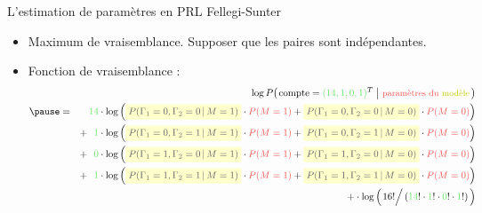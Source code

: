 \begin{frame}{\vskip -0.3cm \large L'estimation de param\`etres en PRL Fellegi-Sunter}
\footnotesize
\begin{itemize}
\pause\item
	Maximum de vraisemblance.\;\;
	Supposer que les paires sont ind\'ependantes.
	\vskip 0.3cm
\pause\item
	Fonction de vraisemblance :
	{\tiny\color{mediumLightGray}
	\begin{eqnarray*}
	&& \log P\!\left(
		\left.
		\textnormal{compte} = {\color{veryDarkGreen}(14 ,1 , 0 ,1)}^{T}
		\;\right\vert\,
		\textnormal{\small\color{customRed}param\`etres du \color{darkYellow}mod\`ele}
		\,\right)
	\\
	\pause
	&=&
		{\color{white}+}\,
		{\color{veryDarkGreen}14} \cdot
			\log\left(
				\colorbox{lightYellow}{\color{darkGray}$P(\Gamma_{1}=0,\Gamma_{2}=0\,\vert\,M=1)$} \cdot {\color{customRed}P(M=1)}
				\overset{{\color{white}.}}{+}
				\colorbox{lightYellow}{\color{darkGray}$P(\Gamma_{1}=0,\Gamma_{2}=0\,\vert\,M=0)$} \cdot {\color{customRed}P(M=0)}
				\right)
	\\
	&&
		+ \, {\color{veryDarkGreen}{\color{white}4}1} \cdot
			\log\left(
				\colorbox{lightYellow}{\color{darkGray}$P(\Gamma_{1}=0,\Gamma_{2}=1\,\vert\,M=1)$} \cdot {\color{customRed}P(M=1)}
				\overset{{\color{white}.}}{+}
				\colorbox{lightYellow}{\color{darkGray}$P(\Gamma_{1}=0,\Gamma_{2}=1\,\vert\,M=0)$} \cdot {\color{customRed}P(M=0)}
				\right)
	\\
	&&
		+ \, {\color{veryDarkGreen}{\color{white}4}0} \cdot
			\log\left(
				\colorbox{lightYellow}{\color{darkGray}$P(\Gamma_{1}=1,\Gamma_{2}=0\,\vert\,M=1)$} \cdot {\color{customRed}P(M=1)}
				\overset{{\color{white}.}}{+}
				\colorbox{lightYellow}{\color{darkGray}$P(\Gamma_{1}=1,\Gamma_{2}=0\,\vert\,M=0)$} \cdot {\color{customRed}P(M=0)}
				\right)
	\\
	&&
		+ \, {\color{veryDarkGreen}{\color{white}4}1} \cdot
			\log\left(
				\colorbox{lightYellow}{\color{darkGray}$P(\Gamma_{1}=1,\Gamma_{2}=1\,\vert\,M=1)$} \cdot {\color{customRed}P(M=1)}
				\overset{{\color{white}.}}{+}
				\colorbox{lightYellow}{\color{darkGray}$P(\Gamma_{1}=1,\Gamma_{2}=1\,\vert\,M=0)$} \cdot {\color{customRed}P(M=0)}
				\right)
	\\
	&&
		+ \cdot \log\left( \left.\overset{{\color{white}.}}{16!} \right/
		({\color{veryDarkGreen}14}! \cdot {\color{veryDarkGreen}1}! \cdot {\color{veryDarkGreen}0}! \cdot {\color{veryDarkGreen}1}!)\,\right)
	\end{eqnarray*}
	}
\end{itemize}

\end{frame}
\normalsize

